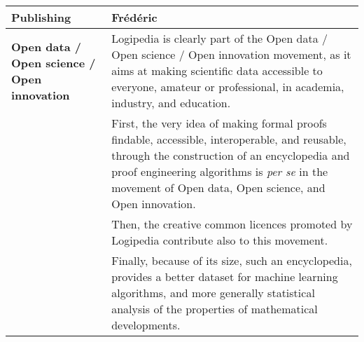 \begin{longtable}{|p{}|p{}|}
\hline
{\bf Publishing}
&
{\color{red} Frédéric}\\
\hline
{\bf Open data / Open science / Open innovation}
&
Logipedia is clearly part of the Open data / Open science / Open
innovation movement, as it aims at making scientific data accessible
to everyone, amateur or professional, in academia, industry, and
education.\\
&
\hspace{0.4cm}
First, the very idea of making formal proofs findable, accessible,
interoperable, and reusable, through the construction of an
encyclopedia and proof engineering algorithms is {\em per se} in the
movement of Open data, Open science, and Open innovation.\\
&
\hspace{0.4cm}
Then, the creative common licences promoted by Logipedia contribute
also to this movement.\\
&
\hspace{0.4cm}
Finally, because of its size, such an encyclopedia, provides a better
dataset for machine learning algorithms, and more generally
statistical analysis of the properties of mathematical developments.
\\
\hline
\end{longtable}


